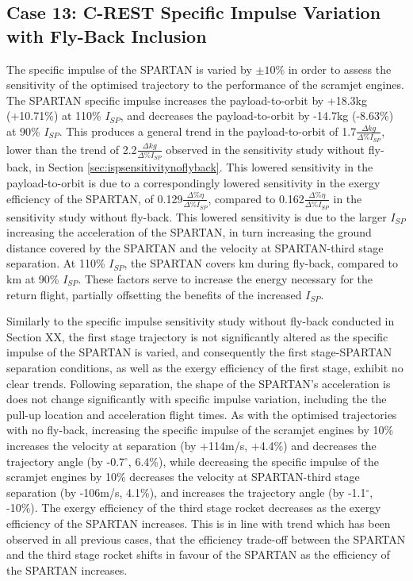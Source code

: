 \subsection{Case 13: C-REST Specific Impulse Variation with Fly-Back Inclusion}

The specific impulse of the SPARTAN is varied by $\pm10\%$ in order to assess the sensitivity of the optimised trajectory to the performance of the scramjet engines.  
The SPARTAN specific impulse increases the payload-to-orbit by +18.3kg (+10.71\%) at 110\% $I_{SP}$, and decreases the payload-to-orbit by -14.7kg (-8.63\%) at 90\% $I_{SP}$. 
This produces a general trend in the payload-to-orbit of 1.7$\frac{\Delta kg}{\Delta \%I_{SP} }$, lower than the trend of 2.2$\frac{\Delta kg}{\Delta \%I_{SP} }$ observed in the sensitivity study without fly-back, in Section \ref{sec:ispsensitivitynoflyback}.
This lowered sensitivity in the payload-to-orbit is due to a correspondingly lowered sensitivity in the exergy efficiency of the SPARTAN, of 0.129$\frac{\Delta \% \eta}{\Delta \%I_{SP} }$, compared to 0.162$\frac{\Delta \% \eta}{\Delta \%I_{SP} }$ in the sensitivity study without fly-back. This lowered sensitivity is due to the larger $I_{SP}$ increasing the acceleration of the SPARTAN, in turn increasing the ground distance covered by the SPARTAN and the velocity at SPARTAN-third stage separation. At 110\% $I_{SP}$, the SPARTAN covers \returnDistIspOneHundredTen km during fly-back, compared to \returnDistIspNinety km at 90\% $I_{SP}$. These factors serve to increase the energy necessary for the return flight, partially offsetting the benefits of the increased $I_{SP}$. 

Similarly to the specific impulse sensitivity study without fly-back conducted in Section XX, the first stage trajectory is not significantly altered as the specific impulse of the SPARTAN is varied, and consequently the first stage-SPARTAN separation conditions, as well as the exergy efficiency of the first stage, exhibit no clear trends. Following separation, the shape of the SPARTAN's acceleration is does not change significantly with specific impulse variation, including the the pull-up location and acceleration flight times. As with the optimised trajectories with no fly-back, increasing the specific impulse of the scramjet engines by 10\% increases the velocity at separation (by +114m/s, +4.4\%) and decreases the trajectory angle (by -0.7$^\circ$, 6.4\%), while decreasing the specific impulse of the scramjet engines by 10\% decreases the velocity at SPARTAN-third stage separation (by -106m/s, 4.1\%), and increases the trajectory angle (by -1.1$^\circ$, -10\%).
The exergy efficiency of the third stage rocket decreases as the exergy efficiency of the SPARTAN increases. This is in line with trend which has been observed in all previous cases, that the efficiency trade-off between the SPARTAN and the third stage rocket shifts in favour of the SPARTAN as the efficiency of the SPARTAN increases. 


